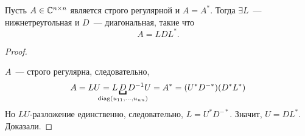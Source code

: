 \begin{corollary}
    Пусть $A \in \mathbb{C}^{n \times n}$ является строго регулярной и $A = A^*$. Тогда $\exists L$~--- нижнетреугольная и $D$~--- диагональная, такие что
    \begin{equation*}
        A = LDL^*.
    \end{equation*}
\end{corollary}
\begin{proof}~

    $A$~--- строго регулярна, следовательно,
    \begin{equation*}
        A = LU = L\underbracket{D}_{\mathclap{\diag(u_{11}, \dots, u_{nn})}}D^{-1}U = A^* = (U^* D^{-*})(D^* L^*)
    \end{equation*}
    Но $LU$-разложение единственно, следовательно, $L = U^*D^{-*}$. Значит, $U = DL^*$. Доказали.

\end{proof}
